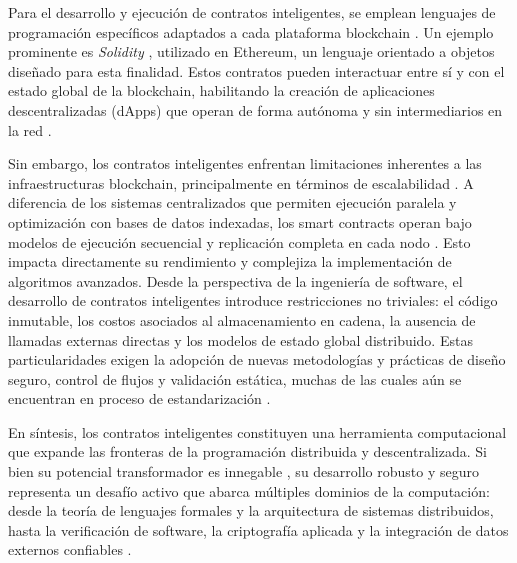 Para el desarrollo y ejecución de contratos inteligentes, se emplean lenguajes de programación específicos adaptados a cada plataforma blockchain \cite{bartolomeo2020introduccion}. Un ejemplo prominente es \textit{Solidity} \cite{taherdoost2023smart}, utilizado en Ethereum, un lenguaje orientado a objetos diseñado para esta finalidad. Estos contratos pueden interactuar entre sí y con el estado global de la blockchain, habilitando la creación de aplicaciones descentralizadas (dApps) que operan de forma autónoma y sin intermediarios en la red \cite{buterin2013ethereum}.

Sin embargo, los contratos inteligentes enfrentan limitaciones inherentes a las infraestructuras blockchain, principalmente en términos de escalabilidad \cite{kalajdjieski2023databases}. A diferencia de los sistemas centralizados que permiten ejecución paralela y optimización con bases de datos indexadas, los smart contracts operan bajo modelos de ejecución secuencial y replicación completa en cada nodo \cite{taherdoost2023smart}. Esto impacta directamente su rendimiento y complejiza la implementación de algoritmos avanzados. Desde la perspectiva de la ingeniería de software, el desarrollo de contratos inteligentes introduce restricciones no triviales: el código inmutable, los costos asociados al almacenamiento en cadena, la ausencia de llamadas externas directas y los modelos de estado global distribuido. Estas particularidades exigen la adopción de nuevas metodologías y prácticas de diseño seguro, control de flujos y validación estática, muchas de las cuales aún se encuentran en proceso de estandarización \cite{taherdoost2023smart, cepal2021economia}.

En síntesis, los contratos inteligentes constituyen una herramienta computacional que expande las fronteras de la programación distribuida y descentralizada. Si bien su potencial transformador es innegable \cite{taherdoost2023smart}, su desarrollo robusto y seguro representa un desafío activo que abarca múltiples dominios de la computación: desde la teoría de lenguajes formales \cite{hoskinson2017we} y la arquitectura de sistemas distribuidos, hasta la verificación de software, la criptografía aplicada y la integración de datos externos confiables \cite{taherdoost2023smart}.

